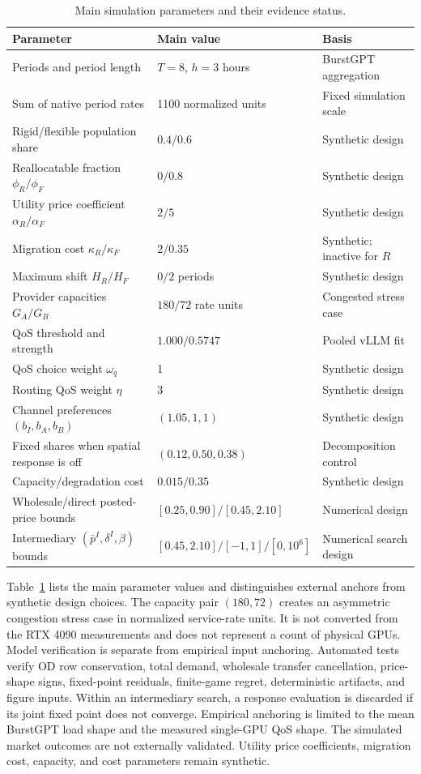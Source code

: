 \documentclass[11pt,a4paper]{article}
\begin{document}
\begin{table}[H]
\centering
\caption{Main simulation parameters and their evidence status.}
\label{tab:parameters}
\small
\begin{tabular}{@{}lll@{}}
\toprule
Parameter & Main value & Basis \\
\midrule
Periods and period length & $T=8$, $h=3$ hours & BurstGPT aggregation \\
Sum of native period rates & 1100 normalized units & Fixed simulation scale \\
Rigid/flexible population share & $0.4/0.6$ & Synthetic design \\
Reallocatable fraction $\phi_R/\phi_F$ & $0/0.8$ & Synthetic design \\
Utility price coefficient $\alpha_R/\alpha_F$ & $2/5$ & Synthetic design \\
Migration cost $\kappa_R/\kappa_F$ & $2/0.35$ & Synthetic; inactive for $R$ \\
Maximum shift $H_R/H_F$ & $0/2$ periods & Synthetic design \\
Provider capacities $G_A/G_B$ & $180/72$ rate units & Congested stress case \\
QoS threshold and strength & $1.000/0.5747$ & Pooled vLLM fit \\
QoS choice weight $\omega_q$ & 1 & Synthetic design \\
Routing QoS weight $\eta$ & 3 & Synthetic design \\
Channel preferences $(b_I,b_A,b_B)$ & $(1.05,1,1)$ & Synthetic design \\
Fixed shares when spatial response is off & $(0.12,0.50,0.38)$ & Decomposition control \\
Capacity/degradation cost & $0.015/0.35$ & Synthetic design \\
Wholesale/direct posted-price bounds & $[0.25,0.90]/[0.45,2.10]$ & Numerical design \\
Intermediary $(\bar p^I,\delta^I,\beta)$ bounds & $[0.45,2.10]/[-1,1]/[0,10^6]$ & Numerical search design \\
\bottomrule
\end{tabular}
\end{table}

Table~\ref{tab:parameters} lists the main parameter values and distinguishes external anchors from synthetic design choices. The capacity pair $(180,72)$ creates an asymmetric congestion stress case in normalized service-rate units. It is not converted from the RTX 4090 measurements and does not represent a count of physical GPUs. Model verification is separate from empirical input anchoring. Automated tests verify OD row conservation, total demand, wholesale transfer cancellation, price-shape signs, fixed-point residuals, finite-game regret, deterministic artifacts, and figure inputs. Within an intermediary search, a response evaluation is discarded if its joint fixed point does not converge. Empirical anchoring is limited to the mean BurstGPT load shape and the measured single-GPU QoS shape. The simulated market outcomes are not externally validated. Utility price coefficients, migration cost, capacity, and cost parameters remain synthetic.
\end{document}
